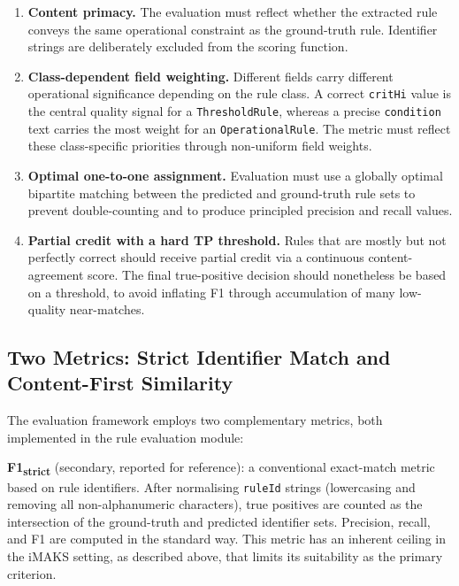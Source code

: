 ﻿\documentclass[11pt]{article}
\begin{document}
\begin{enumerate}
    \item \textbf{Content primacy.}
          The evaluation must reflect whether the extracted rule conveys the
          same operational constraint as the ground-truth rule.
          Identifier strings are deliberately excluded from the scoring function.

    \item \textbf{Class-dependent field weighting.}
          Different fields carry different operational significance depending on
          the rule class.
          A correct \texttt{critHi} value is the central quality signal for a
          \texttt{ThresholdRule}, whereas a precise \texttt{condition} text
          carries the most weight for an \texttt{OperationalRule}.
          The metric must reflect these class-specific priorities through
          non-uniform field weights.

    \item \textbf{Optimal one-to-one assignment.}
          Evaluation must use a globally optimal bipartite matching between the
          predicted and ground-truth rule sets to prevent double-counting and
          to produce principled precision and recall values.

    \item \textbf{Partial credit with a hard TP threshold.}
          Rules that are mostly but not perfectly correct should receive partial
          credit via a continuous content-agreement score.
          The final true-positive decision should nonetheless be based on a
          threshold, to avoid inflating F1 through accumulation of many
          low-quality near-matches.
\end{enumerate}

\subsection{Two Metrics: Strict Identifier Match and Content-First Similarity}
\label{sec:metrics}

The evaluation framework employs two complementary metrics, both implemented in
the rule evaluation module:

\textbf{F1\textsubscript{strict}} (secondary, reported for reference): a
conventional exact-match metric based on rule identifiers.
After normalising \texttt{ruleId} strings (lowercasing and removing all
non-alphanumeric characters), true positives are counted as the intersection of
the ground-truth and predicted identifier sets.
Precision, recall, and F1 are computed in the standard way.
This metric has an inherent ceiling in the iMAKS setting, as described above,
that limits its suitability as the primary criterion.
\end{document}
